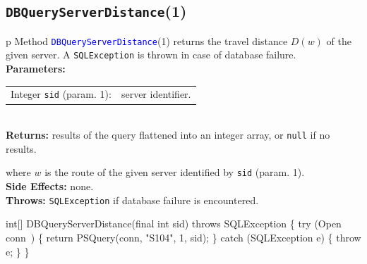 \subsection{\texttt{DBQueryServerDistance}(1)}
\begin{tabular}{p{\textwidth}}
\toprule
{}
Method \textcolor{blue}{{\tt{}\protect{}DBQueryServerDistance}}(1) returns the
travel distance $D(w)$ of the given server.
A {\tt{}SQLException} is thrown in case of database failure.\\
\midrule
\textbf{Parameters:} \\
\begin{tabular}{lp{116mm}}
Integer {\tt{}sid} (param. 1):&server identifier.
\end{tabular}\\
\textbf{Returns:} results of the query flattened into an integer array,
or {\tt{}null} if no results.


where $w$ is the route of the given server identified by {\tt{}sid} (param. 1).\\
\textbf{Side Effects:} none.\\
\textbf{Throws:} {\tt{}SQLException} if database failure is encountered.\\
\bottomrule
\end{tabular}
\nwenddocs{}\endmoddef{}
int[] DBQueryServerDistance(final int sid) throws SQLException \{
  try (\LA{}Open \code{}conn\edoc{}~{\nwtagstyle{}}\RA{}) \{
    return PSQuery(conn, "S104", 1, sid);
  \} catch (SQLException e) \{
    throw e;
  \}
\}
\eatline
{}\nwendcode{}\nwdocspar
